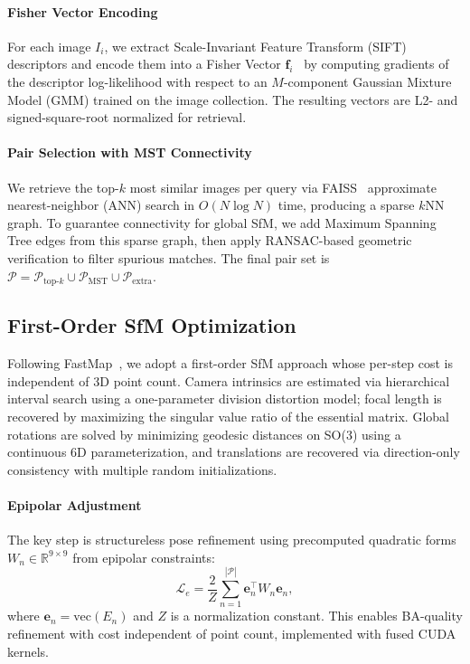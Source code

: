 \documentclass[sigconf]{acmart}
\begin{document}
\paragraph{Fisher Vector Encoding}
For each image $I_i$, we extract Scale-Invariant Feature Transform (SIFT) descriptors and encode them into a Fisher Vector $\mathbf{f}_i$~\cite{perronnin2010fisher} by computing gradients of the descriptor log-likelihood with respect to an $M$-component Gaussian Mixture Model (GMM) trained on the image collection. The resulting vectors are L2- and signed-square-root normalized for retrieval.

\paragraph{Pair Selection with MST Connectivity}
We retrieve the top-$k$ most similar images per query via FAISS~\cite{faiss} approximate nearest-neighbor (ANN) search in $O(N \log N)$ time, producing a sparse $k$NN graph. To guarantee connectivity for global SfM, we add Maximum Spanning Tree edges from this sparse graph, then apply RANSAC-based geometric verification to filter spurious matches. The final pair set is $\mathcal{P} = \mathcal{P}_{\text{top-}k} \cup \mathcal{P}_{\text{MST}} \cup \mathcal{P}_{\text{extra}}$.

\subsection{First-Order SfM Optimization}
\label{sec:fastmap}

Following FastMap~\cite{fastmap}, we adopt a first-order SfM approach whose per-step cost is independent of 3D point count. Camera intrinsics are estimated via hierarchical interval search using a one-parameter division distortion model; focal length is recovered by maximizing the singular value ratio of the essential matrix. Global rotations are solved by minimizing geodesic distances on SO(3) using a continuous 6D parameterization, and translations are recovered via direction-only consistency with multiple random initializations.

\paragraph{Epipolar Adjustment}
The key step is structureless pose refinement using precomputed quadratic forms $W_n \in \mathbb{R}^{9 \times 9}$ from epipolar constraints:
\begin{equation}
    \mathcal{L}_e = \frac{2}{Z} \sum_{n=1}^{|\mathcal{P}|} \mathbf{e}_n^\top W_n \mathbf{e}_n,
\end{equation}
where $\mathbf{e}_n = \text{vec}(E_n)$ and $Z$ is a normalization constant. This enables BA-quality refinement with cost independent of point count, implemented with fused CUDA kernels.
\end{document}
